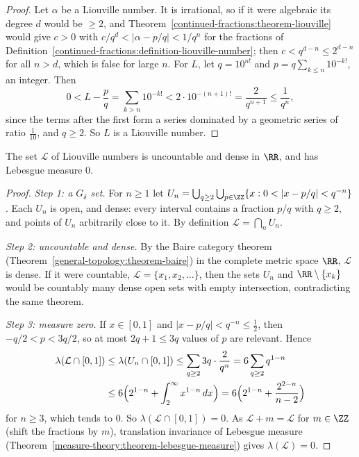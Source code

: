 \begin{proof}
Let $\alpha$ be a Liouville number. It is irrational, so if it were algebraic its degree $d$ would be $\geq 2$, and Theorem~\ref{continued-fractions:theorem-liouville} would give $c > 0$ with
$c/q^d < |\alpha - p/q| < 1/q^n$ for the fractions of Definition~\ref{continued-fractions:definition-liouville-number}; then $c < q^{d-n} \leq 2^{d-n}$ for all $n > d$, which is false for large $n$.
For $L$, let $q = 10^{n!}$ and $p = q\sum_{k \leq n}10^{-k!}$, an integer. Then
\[
0 < L - \frac pq = \sum_{k > n}10^{-k!} < 2 \cdot 10^{-(n+1)!} = \frac{2}{q^{n+1}} \leq \frac{1}{q^n},
\]
since the terms after the first form a series dominated by a geometric series of ratio $\frac1{10}$, and $q \geq 2$. So $L$ is a Liouville number.
\end{proof}

\begin{proposition}\label{continued-fractions:proposition-liouville-set}
The set $\mathcal{L}$ of Liouville numbers is uncountable and dense in $\RR$, and has Lebesgue measure $0$.
\end{proposition}

\begin{proof}
\emph{Step 1: a $G_\delta$ set.} For $n \geq 1$ let $U_n = \bigcup_{q \geq 2}\bigcup_{p \in \ZZ}\{x : 0 < |x - p/q| < q^{-n}\}$. Each $U_n$ is open, and dense: every interval contains a fraction
$p/q$ with $q \geq 2$, and points of $U_n$ arbitrarily close to it. By definition $\mathcal{L} = \bigcap_nU_n$.

\emph{Step 2: uncountable and dense.} By the Baire category theorem (Theorem~\ref{general-topology:theorem-baire}) in the complete metric space $\RR$, $\mathcal{L}$ is dense. If it were countable,
$\mathcal{L} = \{x_1, x_2, \ldots\}$, then the sets $U_n$ and $\RR \setminus \{x_k\}$ would be countably many dense open sets with empty intersection, contradicting the same theorem.

\emph{Step 3: measure zero.} If $x \in [0, 1]$ and $|x - p/q| < q^{-n} \leq \frac12$, then $-q/2 < p < 3q/2$, so at most $2q + 1 \leq 3q$ values of $p$ are relevant. Hence
\[
\begin{aligned}
\lambda(\mathcal{L} \cap [0, 1]) &\leq \lambda(U_n \cap [0, 1]) \leq \sum_{q \geq 2}3q \cdot \frac{2}{q^n} = 6\sum_{q \geq 2}q^{1-n}\\
&\leq 6\Bigl(2^{1-n} + \int_2^\infty x^{1-n}\,dx\Bigr) = 6\Bigl(2^{1-n} + \frac{2^{2-n}}{n - 2}\Bigr)
\end{aligned}
\]
for $n \geq 3$, which tends to $0$. So $\lambda(\mathcal{L} \cap [0, 1]) = 0$. As $\mathcal{L} + m = \mathcal{L}$ for $m \in \ZZ$ (shift the fractions by $m$), translation invariance of Lebesgue measure
(Theorem~\ref{measure-theory:theorem-lebesgue-measure}) gives $\lambda(\mathcal{L}) = 0$.
\end{proof}

